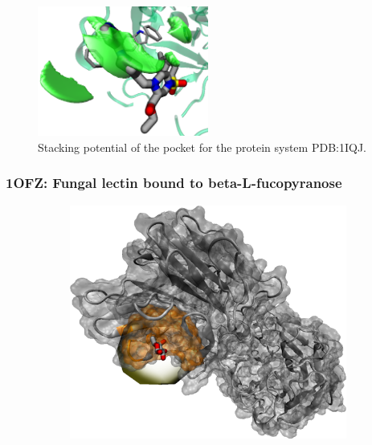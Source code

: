       \begin{figure}[H]
        \centering
        \includegraphics[width=0.5\textwidth]{figures/results/benchmark_prot/1iqj.png}
        \caption{\label{fig:benchmark/1iqj} Stacking potential of the pocket for the protein system PDB:1IQJ.}
      \end{figure}
    \pagebreak

    \subsubsection{1OFZ: Fungal lectin bound to beta-L-fucopyranose}
      \begin{figure}[H] \centering
        \begin{subfigure}[c]{0.3\textwidth} \centering
          \includegraphics[width=1\textwidth]{figures/results/ps_prot/1ofz.png}
        \end{subfigure}
        \begin{subfigure}[c]{0.3\textwidth} \centering
        \end{subfigure}
      \end{figure}

